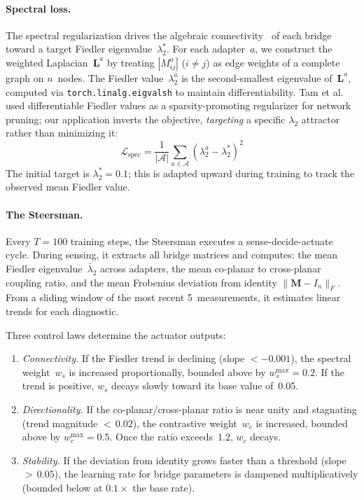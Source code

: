 \documentclass[11pt]{article}
\begin{document}
\paragraph{Spectral loss.}
The spectral regularization drives the algebraic
connectivity~\cite{fiedler1973} of each bridge toward a target Fiedler
eigenvalue~$\lambda_2^*$. For each
adapter~$a$, we construct the weighted Laplacian~$\mathbf{L}^a$ by
treating $|M^a_{ij}|$ ($i \neq j$) as edge weights of a complete
graph on $n$~nodes. The Fiedler value~$\lambda_2^a$ is the
second-smallest eigenvalue of~$\mathbf{L}^a$, computed via
\texttt{torch.linalg.eigvalsh} to maintain differentiability.
Tam et al.~\cite{tam2020fiedler} used differentiable Fiedler values as a
sparsity-promoting regularizer for network pruning; our application
inverts the objective, \emph{targeting} a specific $\lambda_2$ attractor
rather than minimizing it:
%
\begin{equation}
  \mathcal{L}_{\text{spec}} = \frac{1}{|\mathcal{A}|}
    \sum_{a \in \mathcal{A}} (\lambda_2^a - \lambda_2^*)^2
\end{equation}
%
The initial target is $\lambda_2^* = 0.1$; this is adapted upward
during training to track the observed mean Fiedler value.

\paragraph{The Steersman.}
Every $T = 100$ training steps, the Steersman executes a
sense-decide-actuate cycle. During sensing, it extracts all bridge
matrices and computes: the mean Fiedler eigenvalue~$\bar{\lambda}_2$
across adapters, the mean co-planar to cross-planar coupling ratio,
and the mean Frobenius deviation from identity
$\|\mathbf{M} - I_n\|_F$. From a sliding window of the most recent
5~measurements, it estimates linear trends for each diagnostic.

Three control laws determine the actuator outputs:

\begin{enumerate}
  \item \emph{Connectivity.} If the Fiedler trend is declining
    (slope $< -0.001$), the spectral weight~$w_s$ is increased
    proportionally, bounded above by $w_s^{\max} = 0.2$. If the trend
    is positive, $w_s$ decays slowly toward its base value of~0.05.
  \item \emph{Directionality.} If the co-planar/cross-planar ratio is
    near unity and stagnating (trend magnitude ${<}\,0.02$), the
    contrastive weight~$w_c$ is increased, bounded above by
    $w_c^{\max} = 0.5$. Once the ratio exceeds~1.2, $w_c$ decays.
  \item \emph{Stability.} If the deviation from identity grows faster
    than a threshold (slope ${>}\,0.05$), the learning rate for bridge
    parameters is dampened multiplicatively (bounded below at
    $0.1\times$ the base rate).
\end{enumerate}
\end{document}
